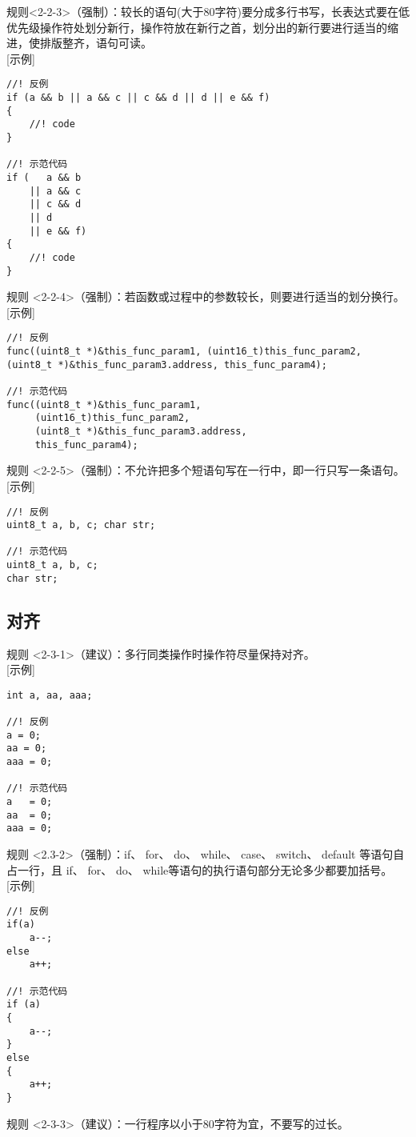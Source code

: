 规则<2-2-3>（强制）：较长的语句(大于80字符)要分成多行书写，长表达式要在低优先级操作符处划分新行，操作符放在新行之首，划分出的新行要进行适当的缩进，使排版整齐，语句可读。\\

[示例]\\
\begin{lstlisting}
//! 反例
if (a && b || a && c || c && d || d || e && f)
{
	//! code
}

//! 示范代码
if (   a && b 
	|| a && c 
	|| c && d 
	|| d 
	|| e && f)
{
	//! code
}
\end{lstlisting}

规则 <2-2-4>（强制）：若函数或过程中的参数较长，则要进行适当的划分换行。\\

[示例]\\
\begin{lstlisting}
//! 反例
func((uint8_t *)&this_func_param1, (uint16_t)this_func_param2, (uint8_t *)&this_func_param3.address, this_func_param4);

//! 示范代码
func((uint8_t *)&this_func_param1, 
	 (uint16_t)this_func_param2, 
	 (uint8_t *)&this_func_param3.address, 
	 this_func_param4);
\end{lstlisting}

规则 <2-2-5>（强制）：不允许把多个短语句写在一行中，即一行只写一条语句。\\

[示例]\\
\begin{lstlisting}
//! 反例
uint8_t a, b, c; char str;

//! 示范代码
uint8_t a, b, c;
char str;
\end{lstlisting}

\subsection{对齐}
规则 <2-3-1>（建议）：多行同类操作时操作符尽量保持对齐。\\

[示例]\\
\begin{lstlisting}
int a, aa, aaa;

//! 反例
a = 0;
aa = 0;
aaa = 0;

//! 示范代码
a   = 0;
aa  = 0;
aaa = 0;
\end{lstlisting}

规则 <2.3-2>（强制）：if、 for、 do、 while、 case、 switch、 default 等语句自占一行，且 if、 for、 do、 while等语句的执行语句部分无论多少都要加括号{}。\\

[示例]\\
\begin{lstlisting}
//! 反例
if(a)
	a--;
else
	a++;

//! 示范代码
if (a)
{
	a--;
}
else
{
	a++;
}
\end{lstlisting}

规则 <2-3-3>（建议）：一行程序以小于80字符为宜，不要写的过长。